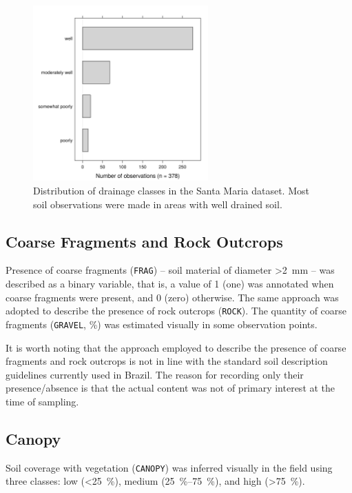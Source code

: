 \begin{figure}[!ht]
\centering
\includegraphics[width=0.60\textwidth]{fig/chap04-drain}
\caption[Distribution of drainage classes in the Santa Maria dataset.]{Distribution of drainage classes in the 
Santa Maria dataset. Most soil observations were made in areas with well drained soil.}
\label{fig:chap04-drain}
\end{figure}

\subsection{Coarse Fragments and Rock Outcrops}

Presence of coarse fragments (\texttt{FRAG}) -- soil material of diameter \SI{>2}{\milli\metre} -- was 
described as a binary variable, that is, a value of \num{1} (one) was annotated when coarse fragments were 
present, and \num{0} (zero) otherwise. The same approach was adopted to describe the presence of rock outcrops 
(\texttt{ROCK}). The quantity of coarse fragments (\texttt{GRAVEL}, \si{\percent}) was estimated visually in 
some observation points.

It is worth noting that the approach employed to describe the presence of coarse fragments and rock outcrops 
is not in line with the standard soil description guidelines currently used in Brazil. The reason for 
recording only their presence/absence is that the actual content was not of primary interest at the time of 
sampling.

\subsection{Canopy}

Soil coverage with vegetation (\texttt{CANOPY}) was inferred visually in the field using three classes: low 
(\SI{<25}{\percent}), medium (\SIrange{25}{75}{\percent}), and high (\SI{>75}{\percent}).

